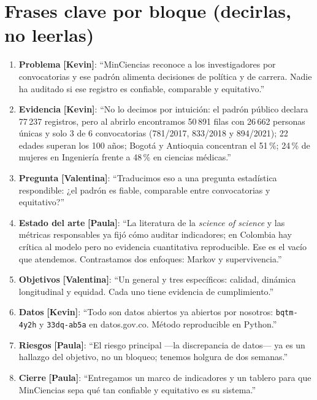 \documentclass[11pt,a4paper]{article}
\newcommand{\quien}[1]{\textbf{[#1]}}
\begin{document}
\section*{Frases clave por bloque (decirlas, no leerlas)}
\begin{enumerate}
  \item \textbf{Problema} \quien{Kevin}: ``MinCiencias reconoce a los
        investigadores por convocatorias y ese padrón alimenta decisiones de
        política y de carrera. Nadie ha auditado si ese registro es confiable,
        comparable y equitativo.''
  \item \textbf{Evidencia} \quien{Kevin}: ``No lo decimos por intuición: el
        padrón público declara 77\,237 registros, pero al abrirlo encontramos
        50\,891 filas con 26\,662 personas únicas y solo 3 de 6 convocatorias
        (781/2017, 833/2018 y 894/2021); 22 edades superan los 100 años;
        Bogotá y Antioquia concentran el 51\,\%; 24\,\% de mujeres en
        Ingeniería frente a 48\,\% en ciencias médicas.''
  \item \textbf{Pregunta} \quien{Valentina}: ``Traducimos eso a una pregunta
        estadística respondible: ¿el padrón es fiable, comparable entre
        convocatorias y equitativo?''
  \item \textbf{Estado del arte} \quien{Paula}: ``La literatura de la
        \emph{science of science} y las métricas responsables ya fijó cómo
        auditar indicadores; en Colombia hay crítica al modelo pero no
        evidencia cuantitativa reproducible. Ese es el vacío que atendemos.
        Contrastamos dos enfoques: Markov y supervivencia.''
  \item \textbf{Objetivos} \quien{Valentina}: ``Un general y tres específicos:
        calidad, dinámica longitudinal y equidad. Cada uno tiene evidencia de
        cumplimiento.''
  \item \textbf{Datos} \quien{Kevin}: ``Todo son datos abiertos ya abiertos
        por nosotros: \texttt{bqtm-4y2h} y \texttt{33dq-ab5a} en
        datos.gov.co. Método reproducible en Python.''
  \item \textbf{Riesgos} \quien{Paula}: ``El riesgo principal —la discrepancia
        de datos— ya es un hallazgo del objetivo, no un bloqueo; tenemos
        holgura de dos semanas.''
  \item \textbf{Cierre} \quien{Paula}: ``Entregamos un marco de indicadores y
        un tablero para que MinCiencias sepa qué tan confiable y equitativo es
        su sistema.''
\end{enumerate}
\end{document}
